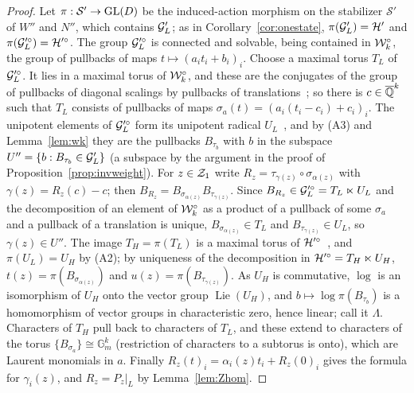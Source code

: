 \begin{proof}
Let $\pi:\mathcal S'\to\mathrm{GL}(D)$ be the induced-action morphism on the stabilizer $\mathcal S'$ of $W''$ and $N''$, which contains $\mathcal{G}'_L$; as in Corollary~\ref{cor:onestate}, $\pi(\mathcal{G}'_L)=\mathcal{H}'$ and $\pi(\mathcal{G}'^\circ_L)=\mathcal{H}'^\circ$. The group $\mathcal{G}'^\circ_L$ is connected and solvable, being contained in $\mathcal{W}_k^\circ$, the group of pullbacks of maps $t\mapsto(a_it_i+b_i)_i$. Choose a maximal torus $T_L$ of $\mathcal{G}'^\circ_L$. It lies in a maximal torus of $\mathcal{W}_k^\circ$, and these are the conjugates of the group of pullbacks of diagonal scalings by pullbacks of translations~\cite[10.6]{Bor91}; so there is $c\in\overline{\mathbb{Q}}^k$ such that $T_L$ consists of pullbacks of maps $\sigma_a(t)=(a_i(t_i-c_i)+c_i)_i$. The unipotent elements of $\mathcal{G}'^\circ_L$ form its unipotent radical $U_L$~\cite[10.6]{Bor91}, and by (A3) and Lemma~\ref{lem:wk} they are the pullbacks $B_{\tau_b}$ with $b$ in the subspace $U''=\{b:B_{\tau_b}\in\mathcal{G}'_L\}$ (a subspace by the argument in the proof of Proposition~\ref{prop:invweight}). For $z\in\mathcal{Z}_1$ write $R_z=\tau_{\gamma(z)}\circ\sigma_{\alpha(z)}$ with $\gamma(z)=R_z(c)-c$; then $B_{R_z}=B_{\sigma_{\alpha(z)}}B_{\tau_{\gamma(z)}}$. Since $B_{R_z}\in\mathcal{G}'^\circ_L=T_L\ltimes U_L$ and the decomposition of an element of $\mathcal{W}_k^\circ$ as a product of a pullback of some $\sigma_a$ and a pullback of a translation is unique, $B_{\sigma_{\alpha(z)}}\in T_L$ and $B_{\tau_{\gamma(z)}}\in U_L$, so $\gamma(z)\in U''$. The image $T_H=\pi(T_L)$ is a maximal torus of $\mathcal{H}'^\circ$~\cite[11.14]{Bor91}, and $\pi(U_L)=U_H$ by (A2); by uniqueness of the decomposition in $\mathcal{H}'^\circ=T_H\ltimes U_H$, $t(z)=\pi(B_{\sigma_{\alpha(z)}})$ and $u(z)=\pi(B_{\tau_{\gamma(z)}})$. As $U_H$ is commutative, $\log$ is an isomorphism of $U_H$ onto the vector group $\operatorname{Lie}(U_H)$, and $b\mapsto\log\pi(B_{\tau_b})$ is a homomorphism of vector groups in characteristic zero, hence linear; call it $\Lambda$. Characters of $T_H$ pull back to characters of $T_L$, and these extend to characters of the torus $\{B_{\sigma_a}\}\cong\mathbb G_m^k$ (restriction of characters to a subtorus is onto), which are Laurent monomials in $a$. Finally $R_z(t)_i=\alpha_i(z)t_i+R_z(0)_i$ gives the formula for $\gamma_i(z)$, and $R_z=P_z|_L$ by Lemma~\ref{lem:Zhom}.
\end{proof}

